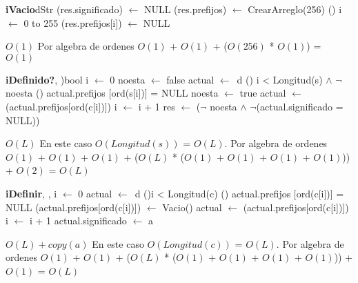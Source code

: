 \begin{Algoritmos}



\begin{algoritmo}{\textbf{iVacio}}{}{dStr}
    	     (res.significado) $\gets$ NULL 
			 (res.prefijos) $\gets$ CrearArreglo(256) 
			 \For () {i $\leftarrow$ 0 to 255}{
				(res.prefijos[i]) $\gets$ NULL 
			 }
    	
\end{algoritmo}
\datosAlgoritmo{} %
  {} %
  {} %
  {$O(1)$} %
  {Por algebra de ordenes $O(1)$ + $O(1)$ + ($O(256)$ * $O(1)$) = $O(1)$} %
  
\begin{algoritmo}{\textbf{iDefinido?}}{, )}{bool}
			 i $\gets$ 0 
			 noesta $\gets$ false 
			 actual $\gets$\ d 
			 \While(){ i < Longitud(s) $\wedge$ $\neg$ noesta}{ 
				\If() {actual.prefijos [ord(s[i])] = NULL}{ 
					noesta $\gets$ true 
				}
				actual $\gets$ (actual.prefijos[ord(c[i])]) 
				i $\gets$ i + 1 
			 }
			 res $\gets$ ($\neg$ noesta $\wedge$ $\neg$(actual.significado = NULL)) 
			    	
\end{algoritmo}
\datosAlgoritmo{} %
  {} %
  {} %
  {$O(L)$} %
  {En este caso $O(Longitud(s))$ = $O(L)$. Por algebra de ordenes $O(1)$ + $O(1)$ + $O(1)$ + ($O(L)$ * ($O(1)$ + $O(1)$ + $O(1)$ + $O(1)$)) + $O(2)$ = $O(L)$} %

\begin{algoritmo}{\textbf{iDefinir}}{, , }{}
			 i $\gets$ 0 
			 actual $\gets$\ d 
			 \While (){i < Longitud(c)}{ 
				\If(){ actual.prefijos [ord(c[i])] = NULL}{ 
					(actual.prefijos[ord(c[i])]) $\gets$ Vacio() 
				}
				actual $\gets$ (actual.prefijos[ord(c[i])]) 
				i $\gets$ i + 1 
			 }
			 actual.significado $\gets$ a   	
\end{algoritmo}
\datosAlgoritmo{} %
  {} %
  {} %
  {$O(L) + copy(a)$} %
  {En este caso $O(Longitud(c))$ = $O(L)$. Por algebra de ordenes $O(1)$ + $O(1)$ + ($O(L)$ * ($O(1)$ + $O(1)$ + $O(1)$ + $O(1)$)) + $O(1)$ = $O(L)$} %
  

\end{Algoritmos}
